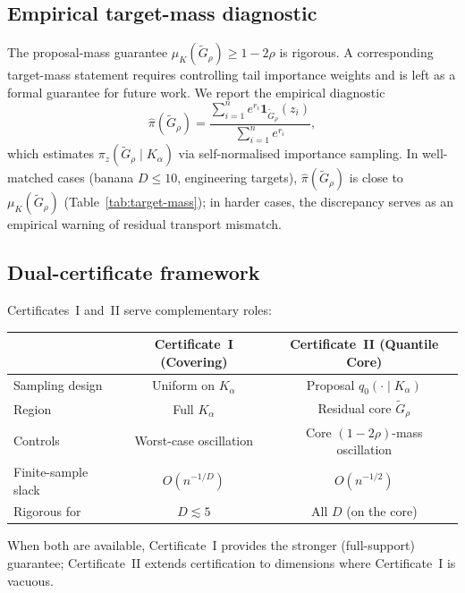 \documentclass[12pt]{article}
\begin{document}
\subsection{Empirical target-mass diagnostic}\label{sec:target-mass}

The proposal-mass guarantee $\mu_K(\tilde{G}_\rho) \ge 1-2\rho$ is rigorous.
A corresponding target-mass statement requires controlling tail importance weights and is left as a formal guarantee for future work.
We report the empirical diagnostic
\begin{equation}\label{eq:pi-hat}
  \hat{\pi}(\tilde{G}_\rho) = \frac{\sum_{i=1}^n e^{r_i} \mathbf{1}_{\tilde{G}_\rho}(z_i)}{\sum_{i=1}^n e^{r_i}},
\end{equation}
which estimates $\pi_z(\tilde{G}_\rho \mid K_\alpha)$ via self-normalised importance sampling.
In well-matched cases (banana $D \le 10$, engineering targets), $\hat{\pi}(\tilde{G}_\rho)$ is close to $\mu_K(\tilde{G}_\rho)$ (Table~\ref{tab:target-mass}); in harder cases, the discrepancy serves as an empirical warning of residual transport mismatch.


\subsection{Dual-certificate framework}\label{sec:dual}

Certificates~I and~II serve complementary roles:

\begin{center}
\begin{tabular}{lcc}
\toprule
& \textbf{Certificate~I (Covering)} & \textbf{Certificate~II (Quantile Core)} \\
\midrule
Sampling design & Uniform on $K_\alpha$ & Proposal $q_0(\cdot \mid K_\alpha)$ \\
Region & Full $K_\alpha$ & Residual core $\tilde{G}_\rho$ \\
Controls & Worst-case oscillation & Core $(1-2\rho)$-mass oscillation \\
Finite-sample slack & $O(n^{-1/D})$ & $O(n^{-1/2})$ \\
Rigorous for & $D \lesssim 5$ & All $D$ (on the core) \\
\bottomrule
\end{tabular}
\end{center}

\noindent When both are available, Certificate~I provides the stronger (full-support) guarantee; Certificate~II extends certification to dimensions where Certificate~I is vacuous.
\end{document}
